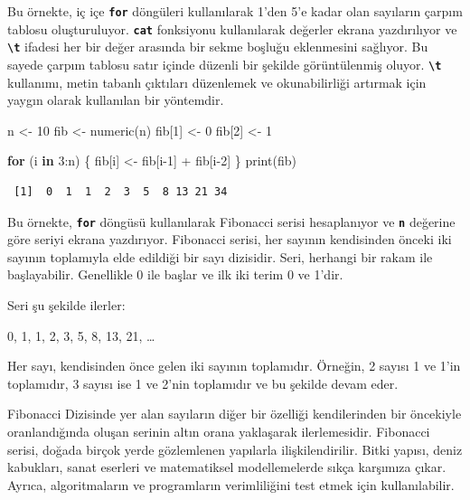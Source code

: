 \documentclass[
  letterpaper,
  DIV=11,
  numbers=noendperiod]{scrreprt}
\newenvironment{Shaded}{\begin{snugshade}}{\end{snugshade}}
\newcommand{\ControlFlowTok}[1]{\textcolor[rgb]{0.00,0.23,0.31}{\textbf{#1}}}
\newcommand{\DecValTok}[1]{\textcolor[rgb]{0.68,0.00,0.00}{#1}}
\newcommand{\FunctionTok}[1]{\textcolor[rgb]{0.28,0.35,0.67}{#1}}
\newcommand{\NormalTok}[1]{\textcolor[rgb]{0.00,0.23,0.31}{#1}}
\newcommand{\OtherTok}[1]{\textcolor[rgb]{0.00,0.23,0.31}{#1}}
\newcommand{\SpecialCharTok}[1]{\textcolor[rgb]{0.37,0.37,0.37}{#1}}
\begin{document}
Bu örnekte, iç içe \textbf{\texttt{for}} döngüleri kullanılarak 1'den
5'e kadar olan sayıların çarpım tablosu oluşturuluyor.
\textbf{\texttt{cat}} fonksiyonu kullanılarak değerler ekrana
yazdırılıyor ve \textbf{\texttt{\textbackslash{}t}} ifadesi her bir
değer arasında bir sekme boşluğu eklenmesini sağlıyor. Bu sayede çarpım
tablosu satır içinde düzenli bir şekilde görüntülenmiş oluyor.
\textbf{\texttt{\textbackslash{}t}} kullanımı, metin tabanlı çıktıları
düzenlemek ve okunabilirliği artırmak için yaygın olarak kullanılan bir
yöntemdir.

\begin{Shaded}
\begin{Highlighting}[]
\NormalTok{n }\OtherTok{\textless{}{-}} \DecValTok{10}
\NormalTok{fib }\OtherTok{\textless{}{-}} \FunctionTok{numeric}\NormalTok{(n)}
\NormalTok{fib[}\DecValTok{1}\NormalTok{] }\OtherTok{\textless{}{-}} \DecValTok{0}
\NormalTok{fib[}\DecValTok{2}\NormalTok{] }\OtherTok{\textless{}{-}} \DecValTok{1}

\ControlFlowTok{for}\NormalTok{ (i }\ControlFlowTok{in} \DecValTok{3}\SpecialCharTok{:}\NormalTok{n) \{}
\NormalTok{  fib[i] }\OtherTok{\textless{}{-}}\NormalTok{ fib[i}\DecValTok{{-}1}\NormalTok{] }\SpecialCharTok{+}\NormalTok{ fib[i}\DecValTok{{-}2}\NormalTok{]}
\NormalTok{\}}
\FunctionTok{print}\NormalTok{(fib)}
\end{Highlighting}
\end{Shaded}

\begin{verbatim}
 [1]  0  1  1  2  3  5  8 13 21 34
\end{verbatim}

Bu örnekte, \textbf{\texttt{for}} döngüsü kullanılarak Fibonacci serisi
hesaplanıyor ve \textbf{\texttt{n}} değerine göre seriyi ekrana
yazdırıyor. Fibonacci serisi, her sayının kendisinden önceki iki sayının
toplamıyla elde edildiği bir sayı dizisidir. Seri, herhangi bir rakam
ile başlayabilir. Genellikle 0 ile başlar ve ilk iki terim 0 ve 1'dir.

Seri şu şekilde ilerler:

0, 1, 1, 2, 3, 5, 8, 13, 21, \ldots{}

Her sayı, kendisinden önce gelen iki sayının toplamıdır. Örneğin, 2
sayısı 1 ve 1'in toplamıdır, 3 sayısı ise 1 ve 2'nin toplamıdır ve bu
şekilde devam eder.

Fibonacci Dizisinde yer alan sayıların diğer bir özelliği kendilerinden
bir öncekiyle oranlandığında oluşan serinin altın orana yaklaşarak
ilerlemesidir. Fibonacci serisi, doğada birçok yerde gözlemlenen
yapılarla ilişkilendirilir. Bitki yapısı, deniz kabukları, sanat
eserleri ve matematiksel modellemelerde sıkça karşımıza çıkar. Ayrıca,
algoritmaların ve programların verimliliğini test etmek için
kullanılabilir.
\end{document}
